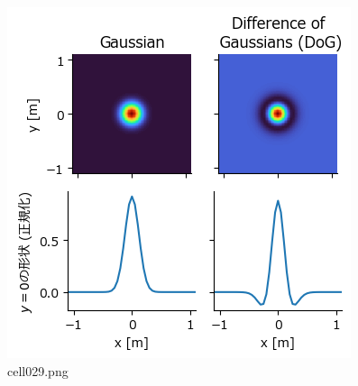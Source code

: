 \begin{figure}[ht]
	\centering
	\includegraphics[scale=0.8, max width=\linewidth]{./fig/local-learning-rule/pca-hebbian-learning/cell029.png}
	\caption{cell029.png}
	\label{cell029.png}
\end{figure}
